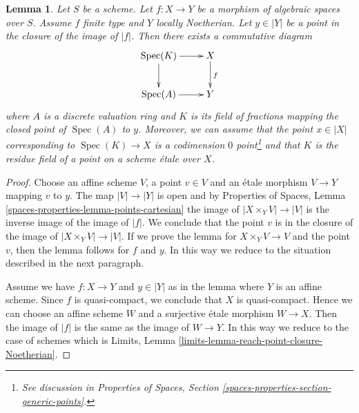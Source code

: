 \documentclass{stacks-project}
\theoremstyle{plain}
\newtheorem{lemma}[subsection]{Lemma}
\theoremstyle{definition}
\theoremstyle{remark}
\numberwithin{equation}{subsection}
\def\Spec{\mathop{\mathrm{Spec}}}
\begin{document}
\begin{lemma}
\label{lemma-reach-point-closure-Noetherian}
Let $S$ be a scheme. Let $f : X \to Y$ be a morphism of algebraic spaces
over $S$. Assume $f$ finite type and $Y$ locally Noetherian.
Let $y \in |Y|$ be a point in the closure of the image of $|f|$.
Then there exists a commutative diagram
$$
\xymatrix{
\Spec(K) \ar[r] \ar[d] & X \ar[d]^f \\
\Spec(A) \ar[r] & Y
}
$$
where $A$ is a discrete valuation ring and $K$ is its field of fractions
mapping the closed point of $\Spec(A)$ to $y$. Moreover, we can assume
that the point $x \in |X|$ corresponding to $\Spec(K) \to X$ is a
codimension $0$ point\footnote{See discussion in
Properties of Spaces, Section \ref{spaces-properties-section-generic-points}.}
and that $K$ is the residue field of a point
on a scheme \'etale over $X$.
\end{lemma}

\begin{proof}
Choose an affine scheme $V$, a point $v \in V$ and an \'etale morphism
$V \to Y$ mapping $v$ to $y$. The map $|V| \to |Y|$ is open and by
Properties of Spaces, Lemma \ref{spaces-properties-lemma-points-cartesian}
the image of $|X \times_Y V| \to |V|$ is the inverse image of the
image of $|f|$. We conclude that the point $v$ is in the closure of the
image of $|X \times_Y V| \to |V|$. If we prove the lemma for
$X \times_Y V \to V$ and the point $v$, then the lemma follows for
$f$ and $y$. In this way we reduce to the situation described in the
next paragraph.

\medskip\noindent
Assume we have $f : X \to Y$ and $y \in |Y|$ as in the lemma where
$Y$ is an affine scheme. Since $f$ is quasi-compact, we conclude that
$X$ is quasi-compact. Hence we can choose an affine scheme $W$ and
a surjective \'etale morphism $W \to X$. Then the image of
$|f|$ is the same as the image of $W \to Y$. In this way we reduce
to the case of schemes which is
Limits, Lemma \ref{limits-lemma-reach-point-closure-Noetherian}.
\end{proof}
\end{document}
